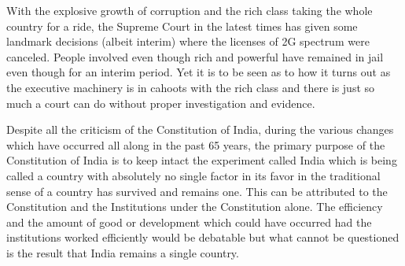 \begin{multicols}{2}
\noi
With the explosive growth of corruption and the rich class taking the whole country for a ride, the Supreme Court in the latest times has given some landmark decisions (albeit interim) where the licenses of 2G spectrum were canceled. People involved even though rich and powerful have remained in jail even though for an interim period. Yet it is to be seen as to how it turns out as the executive machinery is in cahoots with the rich class and there is just so much a court can do without proper investigation and evidence.


\noi
Despite all the criticism of the Constitution of India, during the various changes which have occurred all along in the past 65 years, the primary purpose of the Constitution of India is to keep intact the experiment called India which is being called a country with absolutely no single factor in its favor in the traditional sense of a country has survived and remains one. This can be attributed to the Constitution and the Institutions under the Constitution alone. The efficiency and the amount of good or development which could have occurred had the institutions worked efficiently would be debatable but what cannot be questioned is the result that India remains a single country.



\end{multicols}
\label{end2016-art4}
